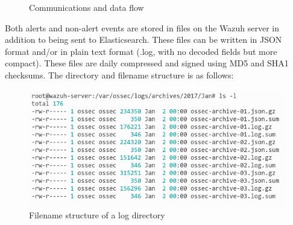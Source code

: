 \begin{figure}[H]
  \centering
	\caption{Communications and data flow}
\end{figure}
\linej
Both alerts and non-alert events are stored in files on the Wazuh server in addition to being sent to Elasticsearch. These files can be written in JSON format and/or in plain text format (.log, with no decoded fields but more compact). These files are daily compressed and signed using MD5 and SHA1 checksums. The directory and filename structure is as follows:
\begin{figure}[H]
  \centering
	\includegraphics[width=\textwidth]{figuras/directory-filename_structure.png}
	\caption{Filename structure of a log directory}
\end{figure}


